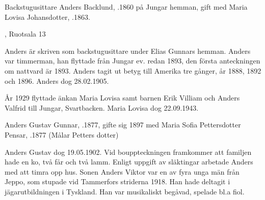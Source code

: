 Backstugusittare Anders Backlund, .1860 på Jungar hemman, gift med Maria Lovisa Johansdotter, .1863.
\begin{jhchildren}
  \item {}
  \item {}
  \item {}, Ruotsala 13
  \item {}
  \item {}
\end{jhchildren}

Anders är skriven som backstugusittare under Elias Gunnars hemman. Anders var timmerman, han flyttade från Jungar ev. redan 1893, den första anteckningen om nattvard är 1893. Anders tagit ut betyg till Amerika tre gånger, år 1888, 1892 och 1896. Anders dog 28.02.1905.

År 1929 flyttade änkan Maria Lovisa samt barnen Erik Villiam och Anders Valfrid till Jungar, Svartbacken. Maria Lovisa dog 22.09.1943.


Anders Gustav Gunnar, .1877, gifte sig 1897 med Maria Sofia Pettersdotter Pensar, .1877 (Målar Petters dotter)
\begin{jhchildren}
  \item {}
  \item {}
  \item {}
\end{jhchildren}

Anders Gustav dog 19.05.1902. Vid bouppteckningen framkommer att familjen hade en ko, två får och två lamm. Enligt uppgift av släktingar arbetade Anders med att timra opp hus. Sonen Anders Viktor var en av fyra unga män från Jeppo, som stupade vid Tammerfors striderna 1918. Han hade deltagit i jägarutbildningen i Tyskland. Han var musikaliskt begåvad, spelade bl.a fiol.


